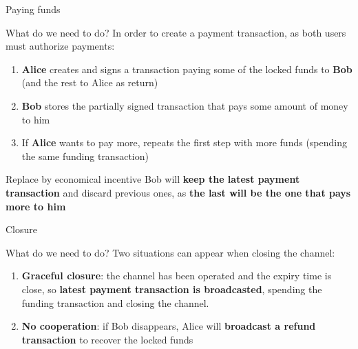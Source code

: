 \documentclass{beamer}
\begin{document}
\begin{frame}{Paying funds}
 \begin{block}{What do we need to do?}
  In order to create a payment transaction, as both users must authorize payments:
  \pause
  \begin{enumerate}[<+->]
   \item \textbf{Alice} creates and signs a transaction paying some of the locked funds to \textbf{Bob} (and the rest to Alice as return)
   \item \textbf{Bob} stores the partially signed transaction that pays some amount of money to him
   \item If \textbf{Alice} wants to pay more, repeats the first step with more funds (spending the same funding transaction)
  \end{enumerate}
 \end{block}
 \pause
 \begin{block}{Replace by economical incentive}
  Bob will \textbf{keep the latest payment transaction} and discard previous ones, as \textbf{the last will be the one that pays more to him}
 \end{block}
\end{frame}
\begin{frame}{Closure}
 \begin{block}{What do we need to do?}
  Two situations can appear when closing the channel:
  \begin{enumerate}[<+->]
   \item \textbf{Graceful closure}: the channel has been operated and the expiry time is close, so \textbf{latest payment transaction is broadcasted}, spending the funding transaction and closing the channel.
   \item \textbf{No cooperation}: if Bob disappears, Alice will \textbf{broadcast a refund transaction} to recover the locked funds
  \end{enumerate}
 \end{block}
\end{frame}
\end{document}

